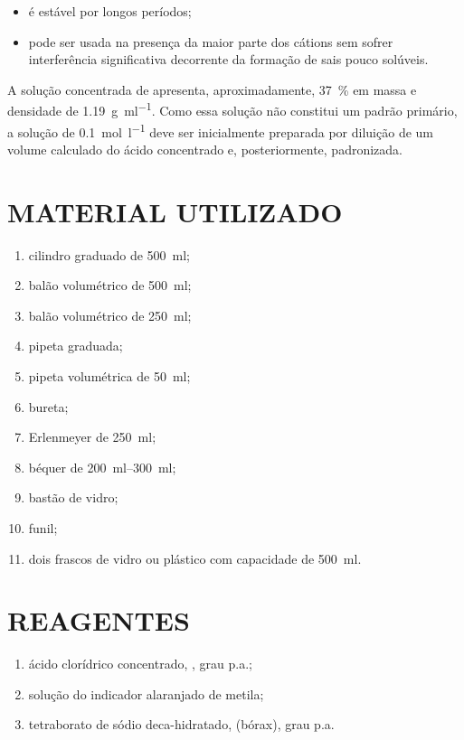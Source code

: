 \documentclass[a4paper,12pt]{article}
\begin{document}
\begin{itemize}
    \item é estável por longos períodos;
    \item pode ser usada na presença da maior parte dos cátions sem sofrer interferência significativa decorrente da formação de sais pouco solúveis.
\end{itemize}

A solução concentrada de  apresenta, aproximadamente, \qty{37}{\percent} em massa e densidade de \qty{1.19}{\gram\per\milli\litre}. Como essa solução não constitui um padrão primário, a solução de  \qty{0.1}{\mole\per\litre} deve ser inicialmente preparada por diluição de um volume calculado do ácido concentrado e, posteriormente, padronizada.

\section{MATERIAL UTILIZADO}

\begin{enumerate}[label=\alph*.]
    \item cilindro graduado de \qty{500}{\milli\litre};
    \item balão volumétrico de \qty{500}{\milli\litre};
    \item balão volumétrico de \qty{250}{\milli\litre};
    \item pipeta graduada;
    \item pipeta volumétrica de \qty{50}{\milli\litre};
    \item bureta;
    \item Erlenmeyer de \qty{250}{\milli\litre};
    \item béquer de \qtyrange{200}{300}{\milli\litre};
    \item bastão de vidro;
    \item funil;
    \item dois frascos de vidro ou plástico com capacidade de \qty{500}{\milli\litre}.
\end{enumerate}

\section{REAGENTES}

\begin{enumerate}[label=\alph*.]
    \item ácido clorídrico concentrado, , grau p.a.;
    \item solução do indicador alaranjado de metila;
    \item tetraborato de sódio deca-hidratado,  (bórax), grau p.a.
\end{enumerate}
\end{document}
